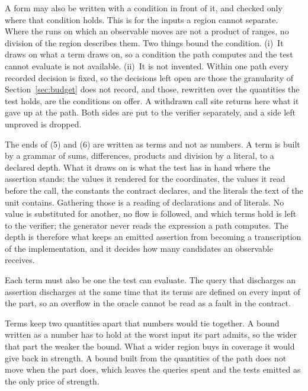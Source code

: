 \documentclass[manuscript,anonymous]{acmart}
\begin{document}
A form may also be written with a condition in front of it, and checked only
where that condition holds. This is for the inputs a region cannot separate.
Where the runs on which an observable moves are not a product of ranges, no
division of the region describes them. Two things bound the condition.
(i)~It draws on what a term draws on, so a condition the path computes and the
test cannot evaluate is not available. (ii)~It is not invented. Within one path
every recorded decision is fixed, so the decisions left open are those the
granularity of Section~\ref{sec:budget} does not record, and those, rewritten
over the quantities the test holds, are the conditions on offer. A withdrawn
call site returns here what it gave up at the path. Both sides are put to the
verifier separately, and a side left unproved is dropped.

The ends of (5) and (6) are written as terms and not as numbers. A term is built by a grammar of sums, differences, products and
division by a literal, to a declared depth. What it draws on is what the test
has in hand where the assertion stands: the values it rendered for the
coordinates, the values it read before the call, the constants the contract
declares, and the literals the text of the unit contains. Gathering those is a
reading of declarations and of literals. No value is substituted for another,
no flow is followed, and which terms hold is left to the verifier; the
generator never reads the expression a path computes. The depth is therefore
what keeps an emitted assertion from becoming a transcription of the
implementation, and it decides how many candidates an observable receives.

Each term must also be one the test can evaluate. The query that discharges an
assertion discharges at the same time that its terms are defined on every input
of the part, so an overflow in the oracle cannot be read as a fault in the
contract.

Terms keep two quantities apart that numbers would tie together. A bound written
as a number has to hold at the worst input its part admits, so the wider that
part the weaker the bound. What a wider region buys in coverage it would give
back in strength. A bound built from the quantities of the path does not move
when the part does, which leaves the queries spent and the tests emitted as the
only price of strength.
\end{document}
